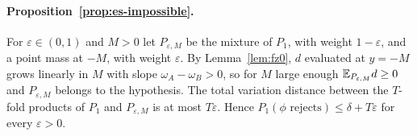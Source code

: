 \paragraph{Proposition~\ref{prop:es-impossible}.}
For $\varepsilon\in(0,1)$ and $M>0$ let $P_{\varepsilon,M}$ be the
mixture of $P_1$, with weight $1-\varepsilon$, and a point mass at $-M$,
with weight $\varepsilon$. By
Lemma~\ref{lem:fz0}, $d$ evaluated at $y=-M$ grows linearly in $M$ with
slope $\omega_A-\omega_B>0$, so for $M$ large enough $\mathbb{E}_{P_{\varepsilon,M}}d\ge0$
and $P_{\varepsilon,M}$ belongs to the hypothesis. The total variation
distance between the $T$-fold products of $P_1$ and $P_{\varepsilon,M}$ is
at most $T\varepsilon$. Hence $P_1(\phi\text{ rejects})\le\delta+T\varepsilon$
for every $\varepsilon>0$.
